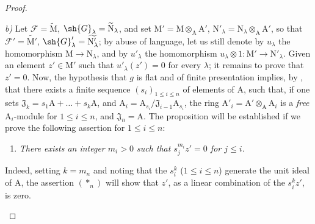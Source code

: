 \begin{proof}
\begin{enumerate}[label=(\roman*)]
  \emph{b)} Let $\mathscr{F}=\widetilde{\mathrm{M}}$, $\sh{G}_\lambda=\widetilde{\mathrm{N}}_\lambda$, and set $\mathrm{M}'=\mathrm{M}\otimes_\mathrm{A}\mathrm{A}'$, $\mathrm{N}'_\lambda=\mathrm{N}_\lambda\otimes_\mathrm{A}\mathrm{A}'$, so that $\mathscr{F}'=\widetilde{\mathrm{M}'}$, $\sh{G}'_\lambda=\widetilde{\mathrm{N}'_\lambda}$; by abuse of language, let us still denote by $u_\lambda$ the homomorphism $\mathrm{M}\to\mathrm{N}_\lambda$, and by $u'_\lambda$ the homomorphism $u_\lambda\otimes 1:\mathrm{M}'\to\mathrm{N}'_\lambda$.
  Given an element $z'\in\mathrm{M}'$ such that $u'_\lambda(z')=0$ for every $\lambda$; it remains to prove that $z'=0$.
  Now, the hypothesis that $g$ is flat and of finite presentation implies, by , that there exists a finite sequence $(s_i)_{1\leq i\leq n}$ of elements of $\mathrm{A}$, such that, if one sets $\mathfrak{J}_k=s_1\mathrm{A}+\ldots+s_k\mathrm{A}$, and $\mathrm{A}_i=\mathrm{A}_{s_i}/\mathfrak{J}_{i-1}\mathrm{A}_{s_i}$, the ring $\mathrm{A}'_i=\mathrm{A}'\otimes_\mathrm{A}\mathrm{A}_i$ is a \emph{free} $\mathrm{A}_i$-module for $1\leq i\leq n$, and $\mathfrak{J}_n=\mathrm{A}$.
  The proposition will be established if we prove the following assertion for $1\leq i\leq n$:
  \begin{enumerate}[label=$(*_i)$]
    \item \emph{There exists an integer $m_i>0$ such that $s_j^{m_i}z'=0$ for $j\leq i$.}
  \end{enumerate}
  Indeed, setting $k=m_n$ and noting that the $s_i^k$ ($1\leq i\leq n$) generate the unit ideal of $\mathrm{A}$, the assertion $(*_n)$ will show that $z'$, as a linear combination of the $s_i^k z'$, is zero.


\end{enumerate}
\end{proof}
